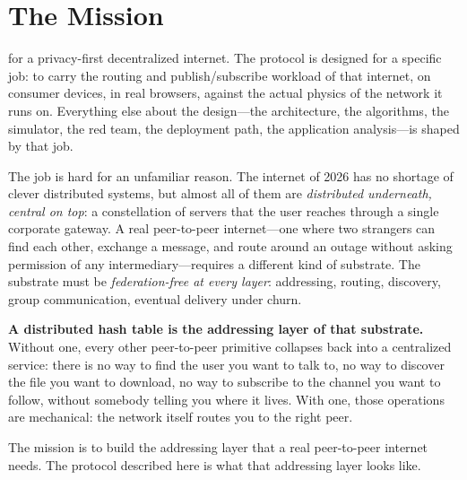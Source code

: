 \documentclass[nobib]{tufte-handout}
\begin{document}
\vspace{1em}

\section{The Mission}

 for a privacy-first
decentralized internet. The protocol is designed for a specific job:
to carry the routing and publish/subscribe workload of that internet,
on consumer devices, in real browsers, against the actual physics of
the network it runs on. Everything else about the design---the
architecture, the algorithms, the simulator, the red team, the
deployment path, the application analysis---is shaped by that job.

The job is hard for an unfamiliar reason. The internet of 2026 has
no shortage of clever distributed systems, but almost all of them
are \emph{distributed underneath, central on top}: a constellation
of servers that the user reaches through a single corporate
gateway. A real peer-to-peer
internet---one where two strangers can find each other, exchange a
message, and route around an outage without asking permission of any
intermediary---requires a different kind of substrate. The substrate
must be \emph{federation-free at every layer}: addressing, routing,
discovery, group communication, eventual delivery under churn.

\textbf{A distributed hash table is the addressing layer of that
substrate.} Without one, every other peer-to-peer primitive
collapses back into a centralized service: there is no way to find
the user you want to talk to, no way to discover the file you want
to download, no way to subscribe to the channel you want to follow,
without somebody telling you where it lives. With one, those
operations are mechanical: the network itself routes you to the
right peer.

The mission is to build the addressing layer that a real
peer-to-peer internet needs. The protocol described here is what
that addressing layer looks like.
\end{document}
